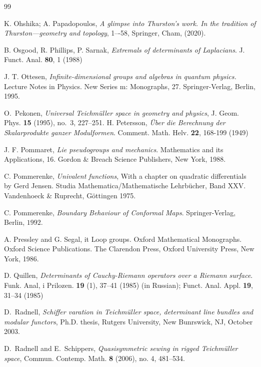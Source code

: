 \documentclass[12pt]{amsart}
\theoremstyle{plain}
\theoremstyle{definition}
\theoremstyle{remark}
\numberwithin{equation}{section} %
\numberwithin{figure}{section} %
\begin{document}
\begin{thebibliography}{99}
    

 K. Ohshika; A. Papadopoulos, {\it A glimpse into Thurston's work. In the tradition of Thurston—geometry and topology}, 1–-58, Springer, Cham, (2020).


 B. Osgood, R. Phillips, P. Sarnak, {\it Extremals of determinants of Laplacians}. J. Funct.
Anal. {\bf 80}, 1 (1988)

 J. T. Ottesen, {\it Infinite-dimensional groups and algebras in quantum physics.} Lecture Notes in Physics. New Series m: Monographs, 27. Springer-Verlag, Berlin, 1995.

O.~Pekonen, {\it Universal Teichm\"uller space in geometry and physics}, J.
  Geom. Phys. \textbf{15} (1995), no.~3, 227--251.
 H. Petersson, {\it \"Uber die Berechnung der Skalarprodukte ganzer Modulformen}. Comment. Math. Helv. {\bf 22}, 168-199 (1949)

 J. F. Pommaret, {\it Lie pseudogroups and mechanics}. Mathematics and its Applications, 16. Gordon \& Breach Science Publishers, New York, 1988.



  C. Pommerenke, {\it Univalent functions}, With a
  chapter on quadratic differentials by Gerd Jensen. Studia Mathematica/Mathematische Lehrb\"ucher, Band XXV. Vandenhoeck \& Ruprecht,
  G\"ottingen  1975.
  
    C. Pommerenke, {\it Boundary Behaviour of Conformal Maps}. Springer-Verlag, Berlin,
\(1992 .\)

 A. Pressley and G. Segal, {it Loop groups}. Oxford Mathematical Monographs. Oxford Science Publications. The Clarendon Press, Oxford University Press, New York, 1986.

 D. Quillen, {\it Determinants of Cauchy-Riemann operators over a Riemann surface}. Funk. Anal, i
Prilozen. {\bf 19} (1), 37--41 (1985) (in Russian); Funct. Anal. Appl. {\bf 19}, 31--34 (1985)

D.~Radnell, {\it Schiffer varation in Teichm{\"u}ller space, determinant
  line bundles and modular functors}, Ph.D. thesis, Rutgers University, New
  Bunrswick, NJ, October 2003.

 D.~Radnell and E.~Schippers, {\it Quasisymmetric sewing in rigged Teichmüller space}, Commun. Contemp. Math. {\bf{8}} (2006), no. 4, 481--534.


\end{thebibliography}
\end{document}
